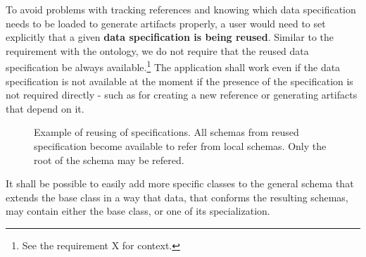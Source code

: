 To avoid problems with tracking references and knowing which data specification needs to be loaded to generate artifacts properly, a user would need to set explicitly that a given \textbf{data specification is being reused}. Similar to the requirement with the ontology, we do not require that the reused data specification be always available.\footnote{See the requirement X for context.} The application shall work even if the data specification is not available at the moment if the presence of the specification is not required directly - such as for creating a new reference or generating artifacts that depend on it.

\begin{figure}[h!]\centering
  \caption{Example of reusing of specifications. All schemas from reused specification become available to refer from local schemas. Only the root of the schema may be refered.}
\end{figure}






\begin{requirement}
    It shall be possible to easily add more specific classes to the general schema that extends the base class in a way that data, that conforms the resulting schemas, may contain either the base class, or one of its specialization.
\end{requirement}

